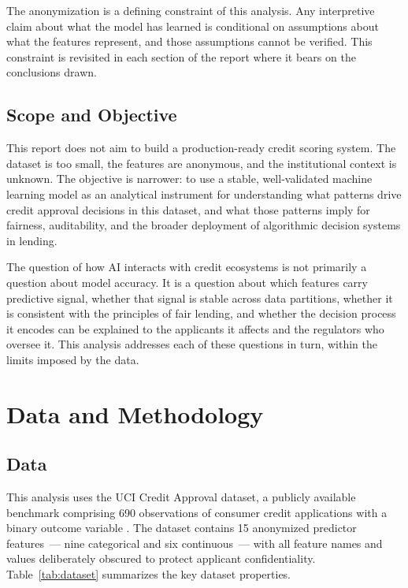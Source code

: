\documentclass[11pt]{article}
\begin{document}
The anonymization is a defining constraint of this analysis. Any interpretive claim about what the model has learned is conditional on assumptions about what the features represent, and those assumptions cannot be verified. This constraint is revisited in each section of the report where it bears on the conclusions drawn.

\subsection{Scope and Objective}

This report does not aim to build a production-ready credit scoring system. The dataset is too small, the features are anonymous, and the institutional context is unknown. The objective is narrower: to use a stable, well-validated machine learning model as an analytical instrument for understanding what patterns drive credit approval decisions in this dataset, and what those patterns imply for fairness, auditability, and the broader deployment of algorithmic decision systems in lending.

The question of how AI interacts with credit ecosystems is not primarily a question about model accuracy. It is a question about which features carry predictive signal, whether that signal is stable across data partitions, whether it is consistent with the principles of fair lending, and whether the decision process it encodes can be explained to the applicants it affects and the regulators who oversee it. This analysis addresses each of these questions in turn, within the limits imposed by the data.

\newpage

\section{Data and Methodology}
\label{sec:model}

\subsection{Data}

This analysis uses the UCI Credit Approval dataset, a publicly available benchmark comprising 690 observations of consumer credit applications with a binary outcome variable \citep{quinlan1987}. The dataset contains 15 anonymized predictor features~--- nine categorical and six continuous~--- with all feature names and values deliberately obscured to protect applicant confidentiality. Table~\ref{tab:dataset} summarizes the key dataset properties.
\end{document}
